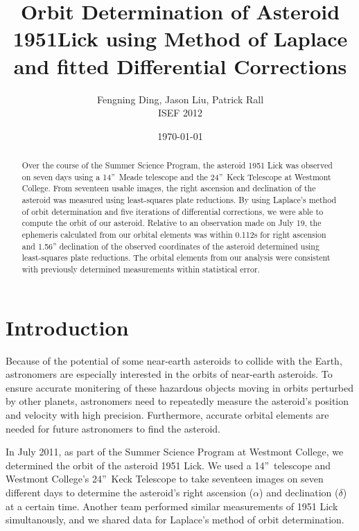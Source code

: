 \documentclass[11pt,a4paper]{article}
\title{Orbit Determination of Asteroid 1951Lick using Method of Laplace and fitted Differential Corrections}
\author{Fengning Ding, Jason Liu, Patrick Rall \\ ISEF 2012}
\date{\today}
\begin{document}
\maketitle
\thispagestyle{empty}
\pagestyle{fancy}

\begin{abstract}
Over the course of the Summer Science Program, the asteroid 1951 Lick was observed on seven days using a 14''~Meade telescope and the 24''~Keck Telescope at Westmont College.
From seventeen usable images, the right ascension and declination of the asteroid was measured using least-squares plate reductions.
By using Laplace's method of orbit determination and five iterations of differential corrections, we were able to compute the orbit of our asteroid.
Relative to an observation made on July 19, the ephemeris calculated from our orbital elements was within 0.112s for right ascension and 1.56'' declination of the observed coordinates of the asteroid determined using least-squares plate reductions.
The orbital elements from our analysis were consistent with previously determined measurements within statistical error.
\end{abstract}

\tableofcontents

\clearpage

\setlength{\parskip}{2ex plus 1.5ex minus 1.5ex}


\section{Introduction}

Because of the potential of some near-earth asteroids to collide with the Earth, astronomers are especially interested in the orbits of near-earth asteroids.
To ensure accurate monitering of these hazardous objects moving in orbits perturbed by other planets, astronomers need to repeatedly measure the asteroid's position and velocity with high precision.
Furthermore, accurate orbital elements are needed for future astronomers to find the asteroid.

In July 2011, as part of the Summer Science Program at Westmont College, we determined the orbit of the asteroid 1951 Lick. We used a 14''~telescope and Westmont College's 24''~Keck Telescope to take seventeen images on seven different days to determine the asteroid's right ascension ($\alpha$) and declination ($\delta$) at a certain time. 
Another team performed similar measurements of 1951 Lick simultanously, and we shared data for Laplace's method of orbit determination.
\end{document}
